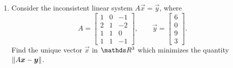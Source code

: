 \documentclass{../homework}
\begin{document}
\begin{Exercise}
\begin{enumerate}
    \begin{solution}
      \begin{proof}

      \end{proof}
    \end{solution}

	\item Consider the inconsistent linear system
    \(A \vec{x} = \vec{y}\), where
		\begin{equation*}
			A =
			\begin{bmatrix}
				1 & 0 & -1 \\ 2 & 1 & -2 \\ 1 & 1 & 0 \\ 1 & 1 & -1
			\end{bmatrix}, \qquad \vec{y} =
      \begin{bmatrix}
        6 \\ 0 \\ 9 \\ 3
      \end{bmatrix}.
		\end{equation*}
		Find the unique vector \(\vec{x}\) in \(\R^3\) which minimizes the
    quantity \(\norm{ A \vec{x} - \vec{y} }\).

    \begin{solution}

    \end{solution}
	\end{enumerate}
\end{Exercise}
\end{document}
